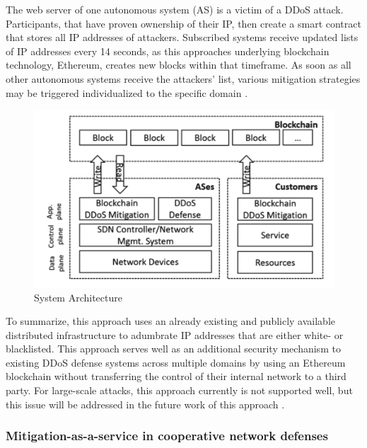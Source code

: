 The web server of one autonomous system (AS) is a victim of a DDoS attack. Participants, that have proven ownership of their IP,  then create a smart contract that stores all IP addresses of attackers. Subscribed systems receive updated lists of IP addresses every 14 seconds, as this approaches underlying blockchain technology, Ethereum, creates new blocks within that timeframe. As soon as all other autonomous systems receive the attackers' list, various mitigation strategies may be triggered individualized to the specific domain \cite{Rodrigues2017}.
\begin{figure}[ht]
  \begin{center}
    \includegraphics[scale=0.6]{Talk7/img/ddos/collaborative_ddos_mitigation_system_architecture}
  \end{center}
  \caption{System Architecture}
  \label{system_architecture}
\end{figure}

To summarize, this approach uses an already existing and publicly available distributed infrastructure to adumbrate IP addresses that are either white- or blacklisted. This approach serves well as an additional security mechanism to existing DDoS defense systems across multiple domains by using an Ethereum blockchain without transferring the control of their internal network to a third party. For large-scale attacks, this approach currently is not supported well, but this issue will be addressed in the future work of this approach \cite{Rodrigues2017}.


\subsubsection{Mitigation-as-a-service in cooperative network defenses}

